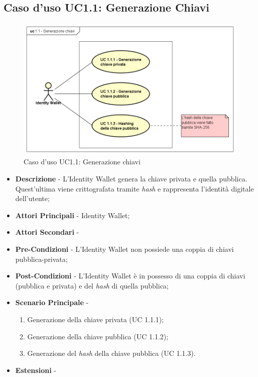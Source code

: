 \subsection{Caso d'uso UC1.1: Generazione Chiavi}
\begin{figure}[h]
	\centering
	\includegraphics[scale=0.50]{immagini/usecase/UC11_GenerazioneChiavi}
	\caption{Caso d'uso UC1.1: Generazione chiavi}
\end{figure}
\begin{itemize}
	\item \textbf{Descrizione} - L'Identity Wallet genera la chiave privata e quella pubblica. Quest'ultima viene crittografata tramite \textit{hash} e rappresenta l'identità digitale dell'utente;
	\item \textbf{Attori Principali} - Identity Wallet;
	\item \textbf{Attori Secondari} -
	\item \textbf{Pre-Condizioni} - L'Identity Wallet non possiede una coppia di chiavi pubblica-privata;
	\item \textbf{Post-Condizioni} - L'Identity Wallet è in possesso di una coppia di chiavi (pubblica e privata) e del \textit{hash} di quella pubblica;
	\item \textbf{Scenario Principale} -
	\begin{enumerate}
		\item Generazione della chiave privata (UC 1.1.1);
		\item Generazione della chiave pubblica (UC 1.1.2);
		\item Generazione del \textit{hash} della chiave pubblica (UC 1.1.3).
	\end{enumerate}
	\item \textbf{Estensioni} -
\end{itemize}
